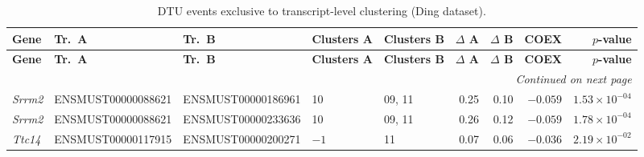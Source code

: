 \begin{landscape}
\begingroup
\setlength{\tabcolsep}{3.5pt}
\begin{longtable}{@{} l l l p{2.8cm} p{2.8cm} r r r r @{}}
\caption{DTU events exclusive to transcript-level clustering (Ding dataset).\label{tab:exc1_landscape}}\\
\toprule
\textbf{Gene} & \textbf{Tr.~A} & \textbf{Tr.~B} & \textbf{Clusters A} & \textbf{Clusters B} & \textbf{$\Delta$ A} & \textbf{$\Delta$ B} & \textbf{COEX} & \textbf{$p$-value} \\
\midrule
\endfirsthead
\toprule
\textbf{Gene} & \textbf{Tr.~A} & \textbf{Tr.~B} & \textbf{Clusters A} & \textbf{Clusters B} & \textbf{$\Delta$ A} & \textbf{$\Delta$ B} & \textbf{COEX} & \textbf{$p$-value} \\
\midrule
\endhead
\midrule
\multicolumn{9}{r}{\textit{Continued on next page}} \\
\endfoot
\bottomrule
\endlastfoot
\textit{Srrm2} & ENSMUST00000088621 & ENSMUST00000186961 & 10 & 09, 11 & 0.25 & 0.10 & $-0.059$ & $1.53 \times 10^{-04}$ \\
\textit{Srrm2} & ENSMUST00000088621 & ENSMUST00000233636 & 10 & 09, 11 & 0.26 & 0.12 & $-0.059$ & $1.78 \times 10^{-04}$ \\
\textit{Ttc14} & ENSMUST00000117915 & ENSMUST00000200271 & $-1$ & 11 & 0.07 & 0.06 & $-0.036$ & $2.19 \times 10^{-02}$ \\
\end{longtable}
\endgroup
\end{landscape}


